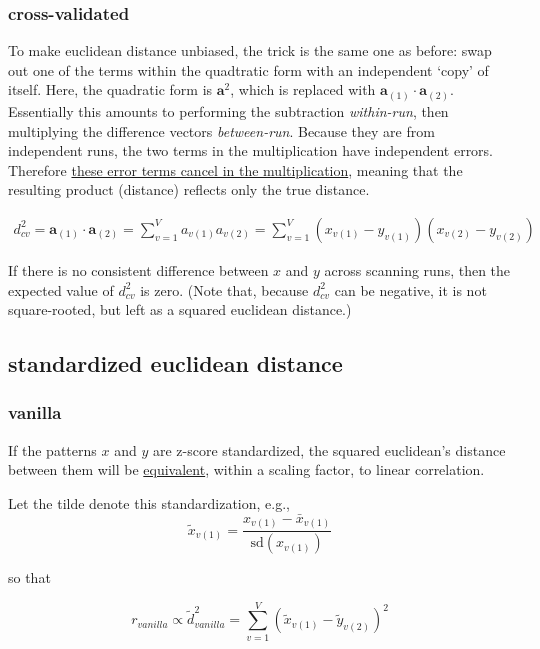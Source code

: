 \documentclass{article}\usepackage[]{graphicx}\usepackage[]{color}
\begin{document}
\subsubsection*{cross-validated}

To make euclidean distance unbiased, the trick is the same one as before: swap out one of the terms within the quadtratic form with an independent `copy' of itself.
Here, the quadratic form is $\mathbf{a}^2$, which is replaced with $\mathbf{a}_{(1)} \cdot \mathbf{a}_{(2)}$.
Essentially this amounts to performing the subtraction \textit{within-run}, then multiplying the difference vectors \textit{between-run}.
Because they are from independent runs, the two terms in the multiplication have independent errors.
Therefore \href{https://www.biorxiv.org/content/10.1101/032391v2}{these error terms cancel in the multiplication}, meaning that the resulting product (distance) reflects only the true distance.

\begin{align}
  d^2_\textit{cv} = \mathbf{a}_{(1)} \cdot \mathbf{a}_{(2)} = \sum_{v = 1}^V a_{v{(1)}}a_{v{(2)}} = \sum_{v = 1}^{V}(x_{v(1)} - y_{v(1)})(x_{v(2)} - y_{v(2)})
\end{align}

If there is no consistent difference between $x$ and $y$ across scanning runs, then the expected value of $d^2_\textit{cv}$ is zero.
(Note that, because $d^2_\textit{cv}$ can be negative, it is not square-rooted, but left as a squared euclidean distance.)


\subsection*{standardized euclidean distance}

\subsubsection*{vanilla}

If the patterns $x$ and $y$ are z-score standardized, the squared euclidean's distance between them will be \href{https://arxiv.org/abs/1601.02213}{equivalent}, within a scaling factor, to linear correlation.

Let the tilde denote this standardization, e.g.,
\[
\widetilde{x}_{v(1)} =
\frac{x_{v(1)} - \bar{x}_{v(1)}}
{\text{sd}(x_{v(1)})}
\]

so that

\begin{equation}
  r_\textit{vanilla} \propto \widetilde{d}^2_\textit{vanilla} = \sum_{v = 1}^{V}(\widetilde{x}_{v(1)} - \widetilde{y}_{v(2)})^2
\end{equation}
\end{document}

